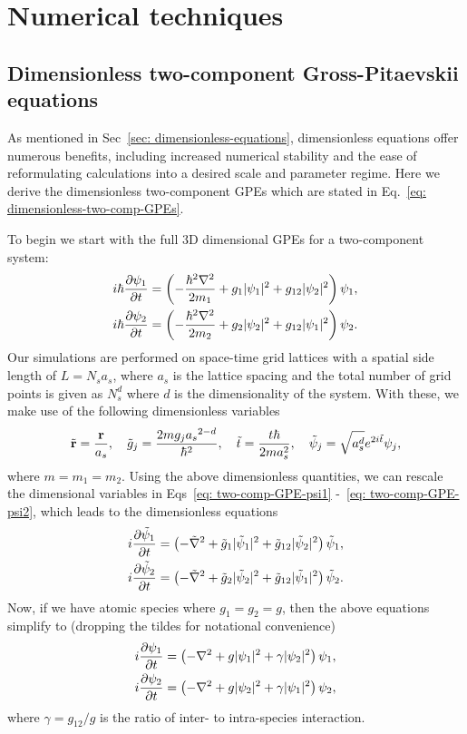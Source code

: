 \chapter{Numerical techniques}

\section{\label{sec: two-comp-dimensionless}Dimensionless two-component
Gross-Pitaevskii equations}

As mentioned in Sec~\ref{sec: dimensionless-equations}, dimensionless equations
offer numerous benefits, including increased numerical stability and the ease
of reformulating calculations into a desired scale and parameter regime.
Here we derive the dimensionless two-component GPEs which are stated in
Eq.~\eqref{eq: dimensionless-two-comp-GPEs}.

To begin we start with the full 3D dimensional GPEs for a two-component system:
\begin{align} \label{eq: two-comp-GPE-psi1}
    i\hbar\pdv{\psi_1}{t} &= \left(-\frac{\hbar^2\nabla^2}{2m_1} + g_1|\psi_1|^2
    +g_{12}|\psi_2|^2\right)\psi_1, \\
    i\hbar\pdv{\psi_2}{t} &= \left(-\frac{\hbar^2\nabla^2}{2m_2} + g_2|\psi_2|^2
    +g_{12}|\psi_1|^2\right)\psi_2. \label{eq: two-comp-GPE-psi2}
\end{align}
Our simulations are performed on space-time grid lattices with a spatial side
length of \(L = N_s a_s\), where \(a_s\) is the lattice spacing and the total
number of grid points is given as \(N_s^d\) where \(d\) is the dimensionality of
the system.
With these, we make use of the following dimensionless variables
\begin{align}
    \tilde{\vb{r}} = \frac{\vb{r}}{a_s}, \quad
    \tilde{g}_j = \frac{2mg_j{a_s}^{2-d}}{\hbar^2}, \quad
    \tilde{t} = \frac{t\hbar}{2ma_s^2}, \quad
    \tilde{\psi}_j = \sqrt{a_s^d}e^{2i\tilde{t}}\psi_j,
\end{align}
where \(m = m_1 = m_2\).
Using the above dimensionless quantities, we can rescale the dimensional
variables in Eqs~\eqref{eq: two-comp-GPE-psi1} -~\eqref{eq: two-comp-GPE-psi2},
which leads to the dimensionless equations
\begin{align}
    i\pdv{\tilde{\psi}_1}{t} &= \left(-\tilde{\nabla}^2
    + \tilde{g}_1|\tilde{\psi}_1|^2 + \tilde{g}_{12}|\tilde{\psi}_2|^2\right)
    \tilde{\psi}_1, \\
    i\pdv{\tilde{\psi}_2}{t} &= \left(-\tilde{\nabla}^2
    + \tilde{g}_2|\tilde{\psi}_2|^2 + \tilde{g}_{12}|\tilde{\psi}_1|^2\right)
    \tilde{\psi}_2.
\end{align}
Now, if we have atomic species where \(g_1=g_2=g\), then the above equations
simplify to (dropping the tildes for notational convenience)
\begin{align}
    i\pdv{{\psi}_1}{t} &= \left(-{\nabla}^2
    + {g}|{\psi}_1|^2 + {\gamma}|{\psi}_2|^2\right)
    {\psi}_1, \\
    i\pdv{{\psi}_2}{t} &= \left(-{\nabla}^2
    + {g}|{\psi}_2|^2 + \gamma|{\psi}_1|^2\right)
    {\psi}_2,
\end{align}
where \(\gamma = g_{12}/g\) is the ratio of inter- to intra-species interaction.